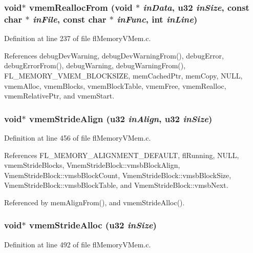 \subsubsection{\setlength{\rightskip}{0pt plus 5cm}void$\ast$ vmem\-Realloc\-From (void $\ast$ {\em in\-Data}, u32 {\em in\-Size}, const char $\ast$ {\em in\-File}, const char $\ast$ {\em in\-Func}, int {\em in\-Line})}\label{flMemoryVMem_8h_512f73544599a5fd0df10e5f9c9ee071}




Definition at line 237 of file fl\-Memory\-VMem.c.

References debug\-Dev\-Warning, debug\-Dev\-Warning\-From(), debug\-Error, debug\-Error\-From(), debug\-Warning, debug\-Warning\-From(), FL\_\-MEMORY\_\-VMEM\_\-BLOCKSIZE, mem\-Cached\-Ptr, mem\-Copy, NULL, vmem\-Alloc, vmem\-Blocks, vmem\-Block\-Table, vmem\-Free, vmem\-Realloc, vmem\-Relative\-Ptr, and vmem\-Start.
\subsubsection{\setlength{\rightskip}{0pt plus 5cm}void$\ast$ vmem\-Stride\-Align (u32 {\em in\-Align}, u32 {\em in\-Size})}\label{flMemoryVMem_8h_d1a90582a0b9a549a0cc3bfd3a142c34}




Definition at line 456 of file fl\-Memory\-VMem.c.

References FL\_\-MEMORY\_\-ALIGNMENT\_\-DEFAULT, fl\-Running, NULL, vmem\-Stride\-Blocks, Vmem\-Stride\-Block::vmsb\-Block\-Align, Vmem\-Stride\-Block::vmsb\-Block\-Count, Vmem\-Stride\-Block::vmsb\-Block\-Size, Vmem\-Stride\-Block::vmsb\-Block\-Table, and Vmem\-Stride\-Block::vmsb\-Next.

Referenced by mem\-Align\-From(), and vmem\-Stride\-Alloc().
\subsubsection{\setlength{\rightskip}{0pt plus 5cm}void$\ast$ vmem\-Stride\-Alloc (u32 {\em in\-Size})}\label{flMemoryVMem_8h_dfe51ec95e7145599cf42de9e54f390b}




Definition at line 492 of file fl\-Memory\-VMem.c.

